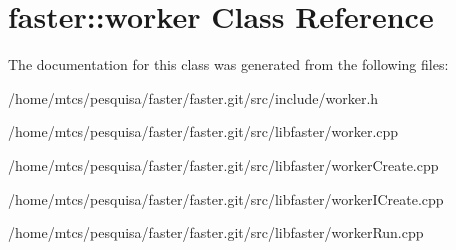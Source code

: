 \hypertarget{classfaster_1_1worker}{}\section{faster\+:\+:worker Class Reference}
\label{classfaster_1_1worker}


The documentation for this class was generated from the following files\+:\begin{DoxyCompactItemize}
\item 
/home/mtcs/pesquisa/faster/faster.\+git/src/include/worker.\+h\item 
/home/mtcs/pesquisa/faster/faster.\+git/src/libfaster/worker.\+cpp\item 
/home/mtcs/pesquisa/faster/faster.\+git/src/libfaster/worker\+Create.\+cpp\item 
/home/mtcs/pesquisa/faster/faster.\+git/src/libfaster/worker\+I\+Create.\+cpp\item 
/home/mtcs/pesquisa/faster/faster.\+git/src/libfaster/worker\+Run.\+cpp\end{DoxyCompactItemize}
